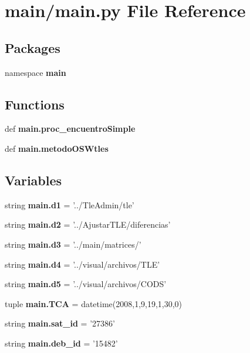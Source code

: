 \section{main/main.py \-File \-Reference}
\label{main_8py}
\subsection*{\-Packages}
\begin{DoxyCompactItemize}
\item 
namespace {\bf main}
\end{DoxyCompactItemize}
\subsection*{\-Functions}
\begin{DoxyCompactItemize}
\item 
def {\bf main.\-proc\-\_\-encuentro\-Simple}
\item 
def {\bf main.\-metodo\-O\-S\-Wtles}
\end{DoxyCompactItemize}
\subsection*{\-Variables}
\begin{DoxyCompactItemize}
\item 
string {\bf main.\-d1} = '../\-Tle\-Admin/tle'
\item 
string {\bf main.\-d2} = '../\-Ajustar\-T\-L\-E/diferencias'
\item 
string {\bf main.\-d3} = '../main/matrices/'
\item 
string {\bf main.\-d4} = '../visual/archivos/\-T\-L\-E'
\item 
string {\bf main.\-d5} = '../visual/archivos/\-C\-O\-D\-S'
\item 
tuple {\bf main.\-T\-C\-A} = datetime(2008,1,9,19,1,30,0)
\item 
string {\bf main.\-sat\-\_\-id} = '27386'
\item 
string {\bf main.\-deb\-\_\-id} = '15482'
\end{DoxyCompactItemize}
